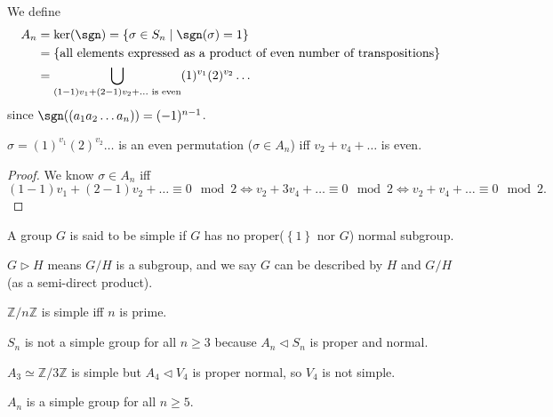     \begin{definition}
        We define 
        \begin{align*}
            A_n &= \ker (\sgn ) = \left\{ \sigma \in S_n \mid \sgn (\sigma ) = 1 \right\} \\
            &= \left\{ \text{all elements expressed as a product of even number of transpositions}  \right\} \\
            &= \bigcup_{(1-1)v_1 + (2-1)v_2 + \dots \text{ is even} } (1)^{v_1} (2)^{v_2} \dots    
        \end{align*}
        since \(\sgn ((a_1 a_2 \dots a_n)) = (-1)^{n-1}\). 
    \end{definition}

    \begin{proposition}
        \(\sigma =(1)^{v_1}(2)^{v_2} \dots \) is an even permutation (\(\sigma \in A_n\)) iff \(v_2 + v_4 + \dots \) is even. 
    \end{proposition}
    \begin{proof}
        We know \(\sigma \in A_n\) iff
        \[
            (1 - 1) v_1 + (2 - 1)v_2 + \dots \equiv 0 \mod{2} \iff v_2 + 3v_4 + \dots \equiv 0 \mod{2} \iff v_2 + v_4 +\dots \equiv 0 \mod{2}.
        \]
    \end{proof}

\begin{definition}
    A group \(G\) is said to be simple if \(G\) has no proper(\(\left\{ 1 \right\} \) nor \(G\)) normal subgroup.   
\end{definition}
\begin{note}
    \(G \triangleright H\) means \(G / H\) is a subgroup, and we say \(G\) can be described by \(H\) and \(G / H\) (as a semi-direct product).     
\end{note}

\begin{eg}
    \(\mathbb{Z} / n \mathbb{Z} \) is simple iff \(n\) is prime.  
\end{eg}

\begin{eg}
    \(S_n\) is not a simple group for all \(n \ge 3\) because \(A_n \triangleleft S_n\) is proper and normal.   
\end{eg}

\begin{eg}
    \(A_3 \simeq \mathbb{Z} / 3 \mathbb{Z} \) is simple but \(A_4 \triangleleft V_4\) is proper normal, so \(V_4\) is not simple.   
\end{eg}

\begin{theorem}
    \(A_n\) is a simple group for all \(n \ge 5\).  
\end{theorem}